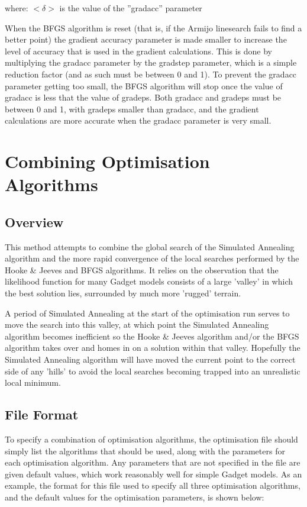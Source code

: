 \documentclass[10pt,twoside]{book}
\begin{document}
where:\newline
$<\delta>$ is the value of the ''gradacc'' parameter

\bigskip
When the BFGS algorithm is reset (that is, if the Armijo linesearch fails to find a better point) the gradient accuracy parameter is made smaller to increase the level of accuracy that is used in the gradient calculations.  This is done by multiplying the gradacc parameter by the gradstep parameter, which is a simple reduction factor (and as such must be between 0 and 1).  To prevent the gradacc parameter getting too small, the BFGS algorithm will stop once the value of gradacc is less that the value of gradeps.  Both gradacc and gradeps must be between 0 and 1, with gradeps smaller than gradacc, and the gradient calculations are more accurate when the gradacc parameter is very small.

\section{Combining Optimisation Algorithms}\label{sec:combine}
\subsection{Overview}\label{subsec:combineover}
This method attempts to combine the global search of the Simulated Annealing algorithm and the more rapid convergence of the local searches performed by the Hooke \& Jeeves and BFGS algorithms.  It relies on the observation that the likelihood function for many Gadget models consists of a large 'valley' in which the best solution lies, surrounded by much more 'rugged' terrain.

\bigskip
A period of Simulated Annealing at the start of the optimisation run serves to move the search into this valley, at which point the Simulated Annealing algorithm becomes inefficient so the Hooke \& Jeeves algorithm and/or the BFGS algorithm takes over and homes in on a solution within that valley.  Hopefully the Simulated Annealing algorithm will have moved the current point to the correct side of any 'hills' to avoid the local searches becoming trapped into an unrealistic local minimum.

\subsection{File Format}\label{subsec:combinefile}
To specify a combination of optimisation algorithms, the optimisation file should simply list the algorithms that should be used, along with the parameters for each optimisation algorithm.  Any parameters that are not specified in the file are given default values, which work reasonably well for simple Gadget models.  As an example, the format for this file used to specify all three optimisation algorithms, and the default values for the optimisation parameters, is shown below:
\end{document}
